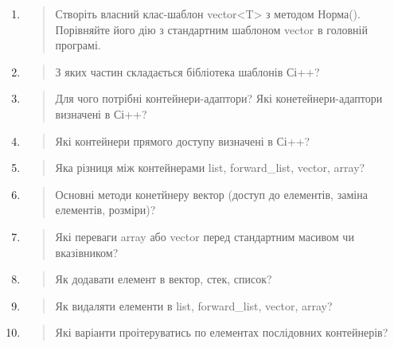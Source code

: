\documentclass[]{article}
\begin{document}
\begin{enumerate}
\def\labelenumi{\arabic{enumi})}
\item
  \begin{quote}
  Створіть власний клас-шаблон vector\textless{}T\textgreater{} з
  методом Норма(). Порівняйте його дію з стандартним шаблоном vector в
  головній програмі.
  \end{quote}
\item
  \begin{quote}
  З яких частин складається бібліотека шаблонів Сі++?
  \end{quote}
\item
  \begin{quote}
  Для чого потрібні контейнери-адаптори? Які конетейнери-адаптори
  визначені в Сі++?
  \end{quote}
\item
  \begin{quote}
  Які контейнери прямого доступу визначені в Сі++?
  \end{quote}
\item
  \begin{quote}
  Яка різниця між контейнерами list, forward\_list, vector, array?
  \end{quote}
\item
  \begin{quote}
  Основні методи конетйнеру вектор (доступ до елементів, заміна
  елементів, розміри)?
  \end{quote}
\item
  \begin{quote}
  Які переваги array або vector перед стандартним масивом чи
  вказівником?
  \end{quote}
\item
  \begin{quote}
  Як додавати елемент в вектор, стек, список?
  \end{quote}
\item
  \begin{quote}
  Як видаляти елементи в list, forward\_list, vector, array?
  \end{quote}
\item
  \begin{quote}
  Які варіанти проітеруватись по елементах послідовних контейнерів?
  \end{quote}
\end{enumerate}
\end{document}
